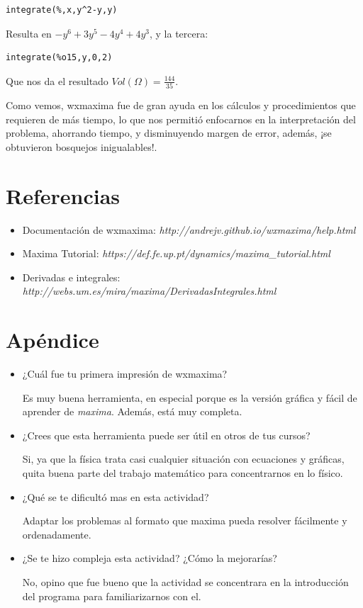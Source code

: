 \documentclass[a4paper]{article}
\begin{document}
\begin{verbatim}
integrate(%,x,y^2-y,y)
\end{verbatim}

Resulta en $-y^6 +3y^5 -4y^4 +4y^3$, y la tercera:

\begin{verbatim}
integrate(%o15,y,0,2)
\end{verbatim}

Que nos da el resultado $Vol(\Omega) = \frac{144}{35}$.

Como vemos, wxmaxima fue de gran ayuda en los cálculos y procedimientos que requieren de más tiempo, lo que nos permitió enfocarnos en la interpretación del problema, ahorrando tiempo, y disminuyendo margen de error, además, ¡se obtuvieron bosquejos  inigualables!.

\section{Referencias}

\begin{itemize}
\item Documentación de wxmaxima: \textit{http://andrejv.github.io/wxmaxima/help.html}

\item Maxima Tutorial: \textit{https://def.fe.up.pt/dynamics/maxima\_tutorial.html}

\item Derivadas e integrales: \textit{http://webs.um.es/mira/maxima/DerivadasIntegrales.html}
\end{itemize}



\section{Apéndice}
\begin{itemize}
\item     ¿Cuál fue tu primera impresión de wxmaxima?

Es muy buena herramienta, en especial porque es la versión gráfica y fácil de aprender de \textit{maxima}. Además, está muy completa.

\item     ¿Crees que esta herramienta puede ser útil en otros de tus cursos?

Si, ya que la física trata casi cualquier situación con ecuaciones y gráficas, quita buena parte del trabajo matemático para concentrarnos en lo físico.

\item     ¿Qué se te dificultó mas en esta actividad?

Adaptar los problemas al formato que maxima pueda resolver fácilmente y ordenadamente.

\item     ¿Se te hizo compleja esta actividad? ¿Cómo la mejorarías?

No, opino que fue bueno que la actividad se concentrara en la introducción del programa para familiarizarnos con el.

\end{itemize}
\end{document}

